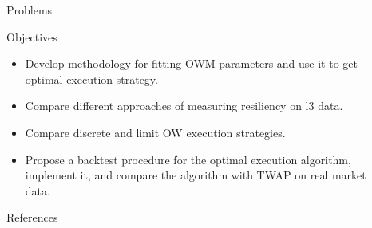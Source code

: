 \documentclass[]{beamer}
\begin{document}
\begin{frame}[t]
\begin{columns}[t]
\begin{column}{\onecolwid}
\begin{block}{Problems}
\begin{itemize}
            \end{itemize}

            
            \end{block}


        \begin{block}{Objectives}
        \begin{itemize}
            \item Develop methodology for fitting OWM parameters and use it to get optimal execution strategy. 
            \item Compare different approaches of measuring resiliency on l3 data.
            \item Compare discrete and limit OW execution strategies.
            \item Propose a backtest procedure for the optimal execution algorithm, implement it, and compare the algorithm with TWAP
            on real market data.
        \end{itemize}
        
        \end{block}
        
        
        \begin{block}{References}
        
        \printbibliography \vspace{0.75in}
        
        \end{block}
        
        \end{column} %
    
    \begin{column}{\lrmargin}\end{column} %
    
    \end{columns} %
    \end{frame} %
\end{document}
